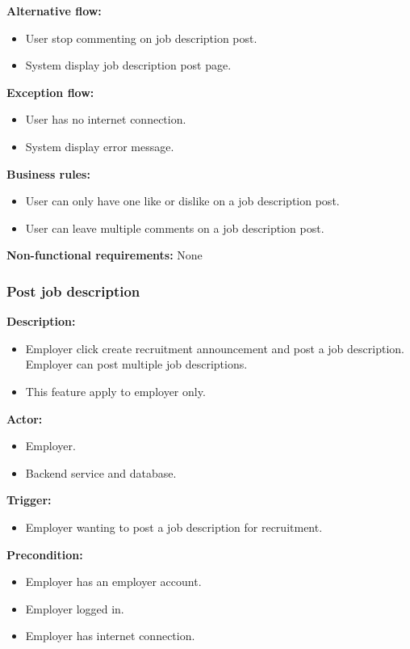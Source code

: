 \documentclass[a4paper]{article}
\begin{document}
\textbf{Alternative flow:}
\begin{itemize}
    \item User stop commenting on job description post.
    \item System display job description post page.
\end{itemize}

\textbf{Exception flow:}
\begin{itemize}
    \item User has no internet connection.
    \item System display error message.
\end{itemize}

\textbf{Business rules:}
\begin{itemize}
    \item User can only have one like or dislike on a job description post.
    \item User can leave multiple comments on a job description post.
\end{itemize}

\textbf{Non-functional requirements:}
None

\subsubsection{Post job description}
\textbf{Description:}
\begin{itemize}
    \item Employer click create recruitment announcement and post a job description. Employer can post multiple job descriptions.
    \item This feature apply to employer only.
\end{itemize}

\textbf{Actor:}
\begin{itemize}
    \item Employer.
    \item Backend service and database.
\end{itemize}

\textbf{Trigger:}
\begin{itemize}
    \item Employer wanting to post a job description for recruitment.
\end{itemize}

\textbf{Precondition:}
\begin{itemize}
    \item Employer has an employer account.
    \item Employer logged in.
    \item Employer has internet connection.
\end{itemize}
\end{document}
